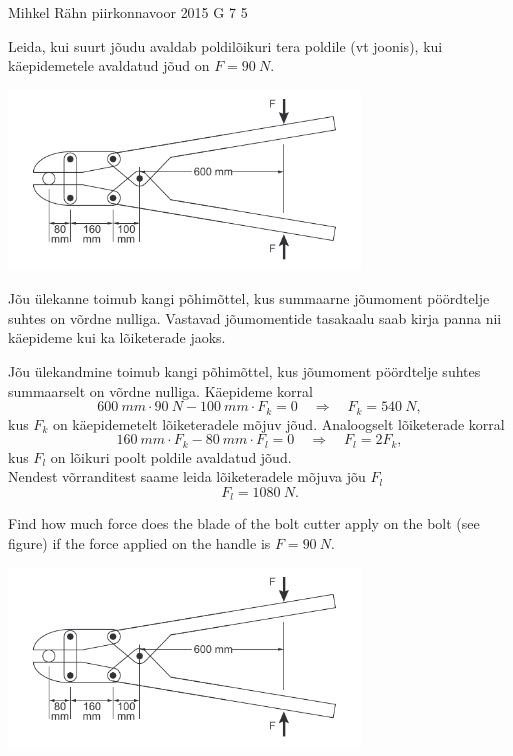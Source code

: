 {Mihkel Rähn} %
{piirkonnavoor} %
{2015} %
{G 7} %
{5} %
{
\ifStatement
Leida, kui suurt jõudu avaldab poldilõikuri tera poldile (vt joonis), kui käepidemetele avaldatud jõud on $F = \SI{90}{N}$.
 \begin{center}
 \includegraphics[width=0.7\textwidth]{2015-v2g-07-poldiloikur}
 \end{center}
\fi


\ifHint
Jõu ülekanne toimub kangi põhimõttel, kus summaarne jõumoment pöördtelje suhtes on võrdne nulliga. Vastavad jõumomentide tasakaalu saab kirja panna nii käepideme kui ka lõiketerade jaoks.
\fi


\ifSolution
Jõu ülekandmine toimub kangi põhimõttel, kus jõumoment pöördtelje suhtes summaarselt on võrdne nulliga. Käepideme korral
\[ \SI{600}{mm}\cdot\SI{90}{N}-\SI{100}{mm}\cdot F_k = 0 \quad\Rightarrow\quad F_k = \SI{540}{N}, \]
kus $F_k$ on käepidemetelt lõiketeradele mõjuv jõud. Analoogselt lõiketerade korral
\[ \SI{160}{mm}\cdot F_k - \SI{80}{mm}\cdot F_l = 0 \quad\Rightarrow\quad F_l = 2F_k, \]
kus $F_l$ on lõikuri poolt poldile avaldatud jõud.\\
Nendest võrranditest saame leida lõiketeradele mõjuva jõu $F_l$
\[ F_l = \SI{1080}{N}.\]
\fi


\ifEngStatement
Find how much force does the blade of the bolt cutter apply on the bolt (see figure) if the force applied on the handle is $F = \SI{90}{N}$.
\begin{center}
    \includegraphics[width=0.7\textwidth]{2015-v2g-07-poldiloikur}
  \end{center}
\fi


}
